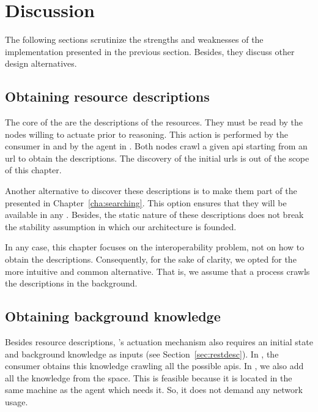 \section{Discussion}
\label{sec:actuation_discussion}

The following sections scrutinize the strengths and weaknesses of the implementation presented in the previous section.
Besides, they discuss other design alternatives. %

\subsection{Obtaining resource descriptions}

The core of the \restActuation{} are the descriptions of the resources.
They must be read by the nodes willing to actuate prior to reasoning. %
This action is performed by the consumer in \implRest{} and by the agent in \implMix{}.
Both nodes crawl a given \ac{api} starting from an \ac{url} to obtain the descriptions.
The discovery of the initial \acp{url} is out of the scope of this chapter.


Another alternative to discover these descriptions is to make them part of the \clues{} presented in Chapter~\ref{cha:searching}.
This option ensures that they will be available in any \consumer{}.
Besides, the static nature of these descriptions does not break the \clues{} stability assumption in which our architecture is founded. %


In any case, this chapter focuses on the interoperability problem, not on how to obtain the descriptions.
Consequently, for the sake of clarity, we opted for the more intuitive and common alternative. %
That is, we assume that a process crawls the descriptions in the background.



\subsection{Obtaining background knowledge}

Besides resource descriptions, \citeauthor{verborgh_ijcs_2014}'s actuation mechanism also requires an initial state and background knowledge as inputs (see Section~\ref{sec:restdesc}).
In \implRest{}, the consumer obtains this knowledge crawling all the possible \acsp{api}.
In \implMix{}, we also add all the knowledge from the space.
This is feasible because it is located in the same machine as the agent which needs it.
So, it does not demand any network usage. %



